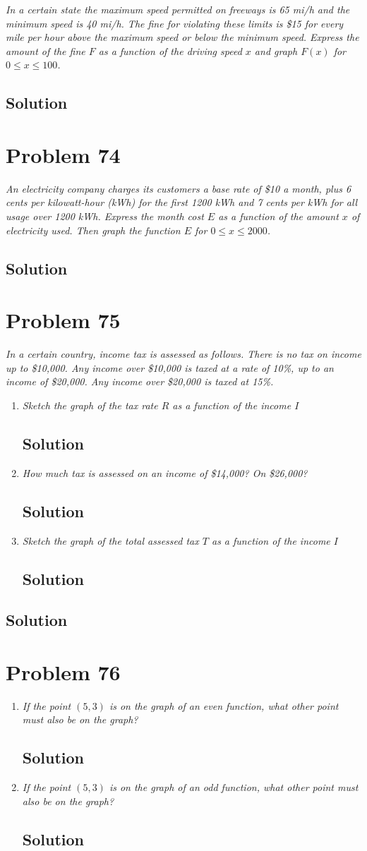 \documentclass[11pt]{article}
\newcommand{\soln}{\subsection*}
\newcommand{\qn}{\textit}
\begin{document}
\qn{In a certain state the maximum speed permitted on freeways is 65 mi/h and the minimum speed is 40 mi/h. The fine for violating these limits is \$15 for every mile per hour above the maximum speed or below the minimum speed. Express the amount of the fine $F$ as a function of the driving speed $x$ and graph $F(x)$ for $0 \le x \le 100$.}

\soln{Solution}

\section*{Problem 74}

\qn{An electricity company charges its customers a base rate of \$10 a month, plus 6 cents per kilowatt-hour (kWh) for the first 1200 kWh and 7 cents per kWh for all usage over 1200 kWh. Express the month cost $E$ as a function of the amount $x$ of electricity used. Then graph the function $E$ for $0 \le x \le 2000$.}

\soln{Solution}

\section*{Problem 75}

\qn{In a certain country, income tax is assessed as follows. There is no tax on income up to \$10,000. Any income over \$10,000 is taxed at a rate of 10\%, up to an income of \$20,000. Any income over \$20,000 is taxed at 15\%.}

\begin{enumerate}
	\item \qn{Sketch the graph of the tax rate $R$ as a function of the income $I$}
	\soln{Solution}
	
	\item \qn{How much tax is assessed on an income of \$14,000? On \$26,000?}
	\soln{Solution}
	
	\item \qn{Sketch the graph of the total assessed tax $T$ as a function of the income $I$}
	\soln{Solution}
\end{enumerate}

\soln{Solution}

\section*{Problem 76}

\begin{enumerate}
	\item \qn{If the point $(5,3)$ is on the graph of an even function, what other point must also be on the graph?}
	\soln{Solution}
	
	\item \qn{If the point $(5,3)$ is on the graph of an odd function, what other point must also be on the graph?}
	\soln{Solution}
\end{enumerate}
\end{document}
